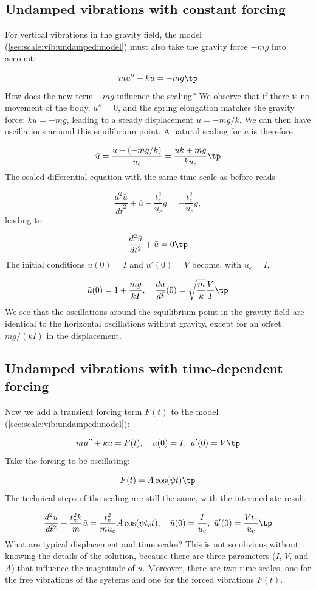 \documentclass[graybox,envcountchap,sectrefs,final]{svmonodo}
\begin{document}
\subsection{Undamped vibrations with constant forcing}
\label{sec:scale:vib:undamped:mg}

For vertical vibrations in the gravity field, the model
(\ref{sec:scale:vib:undamped:model}) must also take the gravity force
$-mg$ into account:

\[ mu'' + ku = -mg\tp\]
How does the new term $-mg$ influence
the scaling? We observe that if there is no movement of the body,
$u''=0$, and the spring elongation matches the gravity force:
$ku = -mg$, leading to a steady displacement $u=-mg/k$. We can then
have oscillations around this equilibrium point. A natural scaling
for $u$ is therefore

\[ \bar u = \frac{u - (-mg/k)}{u_c}=\frac{uk + mg}{ku_c}\tp\]
The scaled differential equation with the same time scale as before
reads

\[ \frac{d^2\bar u}{d\bar t^2} + \bar u - \frac{t_c^2}{u_c}g
= -\frac{t_c^2}{u_c}g,\]
leading to

\[ \frac{d^2\bar u}{d\bar t^2} + \bar u = 0\tp\]
The initial conditions $u(0)=I$ and $u'(0)=V$ become, with $u_c=I$,

\[ \bar u(0) = 1 + \frac{mg}{kI},\quad \frac{d\bar u}{d\bar t}(0)=\sqrt{\frac{m}{k}}\frac{V}{I}\tp\]
We see that the oscillations around the equilibrium point in the
gravity field are identical to the horizontal oscillations without
gravity, except for an offset $mg/(kI)$ in the displacement.


\subsection{Undamped vibrations with time-dependent forcing}
\label{sec:scale:vib:undamped:F}

Now we add a transient forcing term $F(t)$ to the model
(\ref{sec:scale:vib:undamped:model}):

\begin{equation}
mu'' + ku = F(t),\quad u(0)=I,\ u'(0)=V\tp
\label{sec:scale:vib:undamped:F:model}
\end{equation}
Take the forcing to be oscillating:

\[ F(t) = A\cos(\psi t)\tp\]
The technical steps of the scaling are still the same, with the
intermediate result

\begin{equation}
\frac{d^2\bar u}{d\bar t^2} + \frac{t_c^2 k}{m}\bar u =
\frac{t_c^2}{mu_c}A\cos(\psi t_c\bar t),
\quad \bar u(0)=\frac{I}{u_c},\ \bar u'(0)=\frac{Vt_c}{u_c}\tp
\label{sec:scale:vib:undamped:F:model:scaled0}
\end{equation}
What are typical displacement and time scales? This is not so obvious
without knowing the details of the solution, because there are
three parameters ($I$, $V$, and $A$) that influence the magnitude of $u$.
Moreover, there are two time scales, one for the free vibrations of
the systems and one for the forced vibrations $F(t)$.
\end{document}

